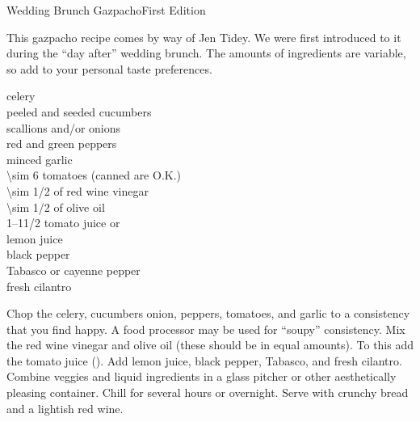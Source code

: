 \begin{entry}{Wedding Brunch Gazpacho}{First Edition}

\begin{open}
  This gazpacho recipe comes by way of Jen Tidey.  We were first
  introduced to it during the ``day after'' wedding brunch.  The amounts of
  ingredients are variable, so add to your personal taste preferences.
\end{open}
\begin{ingredients}
  celery \\
  peeled and seeded cucumbers \\
  scallions and/or onions \\
  red and green peppers \\
  minced garlic \\
  \num{\sim 6} tomatoes (canned are O.K.) \\
  \SI{\sim 1/2}{\cup} of red wine vinegar \\
  \SI{\sim 1/2}{\cup} of olive oil \\
  \numrange{1}{1}\SI{1/2}{\cup} tomato juice or  \\
  lemon juice \\
  black pepper \\
  Tabasco or cayenne pepper \\
  fresh cilantro
\end{ingredients}
Chop the celery, cucumbers onion, peppers, tomatoes, and garlic to a
consistency that you find happy.  A food processor may be used for ``soupy''
consistency.  Mix the red wine vinegar and olive oil (these should be in equal
amounts).  To this add the tomato juice ().  Add lemon juice, black
pepper, Tabasco, and fresh cilantro.  Combine veggies and liquid ingredients
in a glass pitcher or other aesthetically pleasing container.  Chill for
several hours or overnight.  Serve with crunchy bread and a lightish red wine.
\end{entry}

